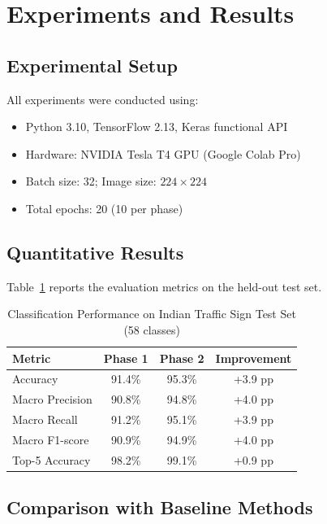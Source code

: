 \documentclass[journal,10pt,twocolumn]{IEEEtran}
\begin{document}
\section{Experiments and Results}
\label{sec:experiments}

\subsection{Experimental Setup}

All experiments were conducted using:
\begin{itemize}[nosep,leftmargin=*]
  \item Python 3.10, TensorFlow 2.13, Keras functional API
  \item Hardware: NVIDIA Tesla T4 GPU (Google Colab Pro)
  \item Batch size: 32; Image size: $224\times224$
  \item Total epochs: 20 (10 per phase)
\end{itemize}

\subsection{Quantitative Results}

Table~\ref{tab:results} reports the evaluation metrics on the held-out test set.

\begin{table}[H]
\centering
\caption{Classification Performance on Indian Traffic Sign Test Set (58 classes)}
\label{tab:results}
\begin{tabular}{lccc}
\toprule
\textbf{Metric} & \textbf{Phase 1} & \textbf{Phase 2} & \textbf{Improvement} \\
\midrule
Accuracy       & 91.4\% & 95.3\% & +3.9 pp \\
Macro Precision & 90.8\% & 94.8\% & +4.0 pp \\
Macro Recall    & 91.2\% & 95.1\% & +3.9 pp \\
Macro F1-score  & 90.9\% & 94.9\% & +4.0 pp \\
Top-5 Accuracy  & 98.2\% & 99.1\% & +0.9 pp \\
\bottomrule
\end{tabular}
\end{table}

\subsection{Comparison with Baseline Methods}
\end{document}
